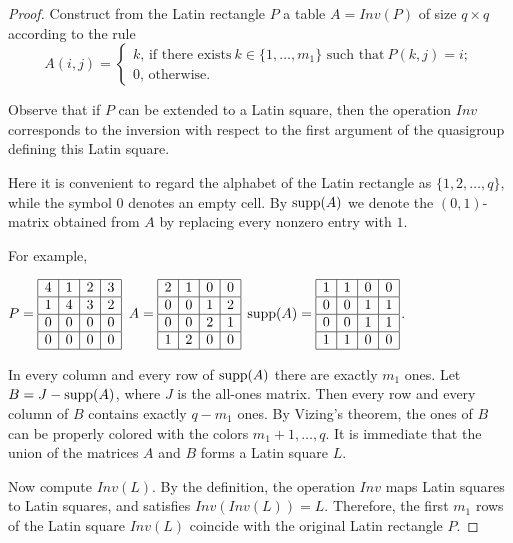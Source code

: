 \documentclass[11pt]{article}
\theoremstyle{definition}
\newcommand{\supp}{{\rm supp}}
\begin{document}
{{{\begin{proof}
 Construct
from the Latin rectangle $P$ a table $A=Inv(P)$ of size $q\times
q$ according to the rule
\[ A({i,j})= \left\{
\begin{array}{l}
k\mbox{, if there exists}\ k\in \{1,\dots,m_1\} \mbox{ such that}\ P(k,j)=i;\\
0\mbox{, otherwise}.
\end{array}
\right.
\]

Observe that if  $P$ can be extended to a Latin
square, then the operation $Inv$ corresponds to the inversion with respect to the first
argument of the quasigroup defining this Latin square.


Here it is convenient to regard the alphabet of the Latin rectangle as $\{1,2,\ldots,q\}$, while the symbol $0$ denotes an empty cell. By $\supp(A)$ we denote the $(0,1)$-matrix obtained from $A$ by replacing every nonzero entry with $1$.

For example,

 $P=\begin{array}{|c|c|c|c|}
\hline 4&1&2&3 \\
\hline
1&4&3&2 \\
 \hline
 0&0&0&0\\
\hline 0&0&0&0\\ \hline
\end{array}$\qquad
$A=\begin{array}{|c|c|c|c|}
\hline 2&1&0&0 \\
\hline
0&0&1&2 \\
 \hline
 0&0&2&1\\
\hline 1&2&0&0\\ \hline
\end{array}$
\qquad $\supp(A)=\begin{array}{|c|c|c|c|}
\hline 1&1&0&0 \\
\hline
0&0&1&1 \\
 \hline
 0&0&1&1\\
\hline 1&1&0&0\\ \hline
\end{array}$.


In every column and every row of  $\supp(A)$ there are exactly $m_1$ ones.
Let $B=J-\supp(A)$, where $J$ is the all-ones matrix. 
Then every row and every column of $B$ contains exactly $q-m_1$ ones. By Vizing's theorem, the ones of $B$ can be properly colored with the colors $m_1+1,\ldots,q$. It is immediate that the union of the matrices $A$ and $B$ forms a Latin square $L$.

Now compute $Inv(L)$. By the definition, the operation $Inv$ maps
 Latin squares to Latin squares, and satisfies
$Inv(Inv(L))=L$. Therefore, the first $m_1$ rows of the Latin square
$Inv(L)$ coincide with the original Latin rectangle $P$.



\end{proof}}}}
\end{document}
